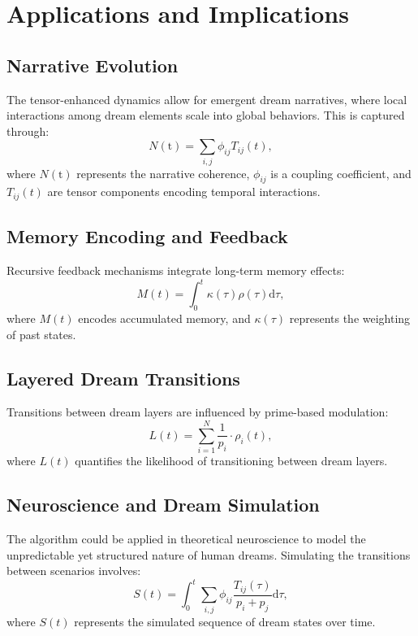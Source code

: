 \documentclass{article}
\theoremstyle{plain}
\begin{document}
\section{Applications and Implications}
\subsection{Narrative Evolution}
The tensor-enhanced dynamics allow for emergent dream narratives, where local interactions among dream elements scale into global behaviors. This is captured through:
\begin{equation}
N(\text{t}) = \sum_{i,j} \phi_{ij} T_{ij}(t),
\end{equation}
where $N(\text{t})$ represents the narrative coherence, $\phi_{ij}$ is a coupling coefficient, and $T_{ij}(t)$ are tensor components encoding temporal interactions.

\subsection{Memory Encoding and Feedback}
Recursive feedback mechanisms integrate long-term memory effects:
\begin{equation}
M(t) = \int_0^t \kappa(\tau) \rho(\tau) \mathrm{d}\tau,
\end{equation}
where $M(t)$ encodes accumulated memory, and $\kappa(\tau)$ represents the weighting of past states.

\subsection{Layered Dream Transitions}
Transitions between dream layers are influenced by prime-based modulation:
\begin{equation}
L(t) = \sum_{i=1}^N \frac{1}{p_i} \cdot \rho_i(t),
\end{equation}
where $L(t)$ quantifies the likelihood of transitioning between dream layers.

\subsection{Neuroscience and Dream Simulation}
The algorithm could be applied in theoretical neuroscience to model the unpredictable yet structured nature of human dreams. Simulating the transitions between scenarios involves:
\begin{equation}
S(t) = \int_0^t \sum_{i,j} \phi_{ij} \frac{T_{ij}(\tau)}{p_i + p_j} \mathrm{d}\tau,
\end{equation}
where $S(t)$ represents the simulated sequence of dream states over time.
\end{document}
